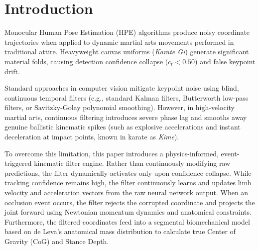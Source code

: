 \section{Introduction}
\label{sec:intro}

Monocular Human Pose Estimation (HPE) algorithms produce noisy coordinate trajectories when applied to dynamic martial arts movements performed in traditional attire. Heavyweight canvas uniforms (\textit{Karate Gi}) generate significant material folds, causing detection confidence collapse ($c_t < 0.50$) and false keypoint drift.

Standard approaches in computer vision mitigate keypoint noise using blind, continuous temporal filters (e.g., standard Kalman filters, Butterworth low-pass filters, or Savitzky-Golay polynomial smoothing). However, in high-velocity martial arts, continuous filtering introduces severe phase lag and smooths away genuine ballistic kinematic spikes (such as explosive accelerations and instant deceleration at impact points, known in karate as \textit{Kime}).

To overcome this limitation, this paper introduces a physics-informed, event-triggered kinematic filter engine. Rather than continuously modifying raw predictions, the filter dynamically activates only upon confidence collapse. While tracking confidence remains high, the filter continuously learns and updates limb velocity and acceleration vectors from the raw neural network output. When an occlusion event occurs, the filter rejects the corrupted coordinate and projects the joint forward using Newtonian momentum dynamics and anatomical constraints. Furthermore, the filtered coordinates feed into a segmental biomechanical model based on de Leva's anatomical mass distribution \cite{deleva1996adjustments} to calculate true Center of Gravity (CoG) and Stance Depth.
